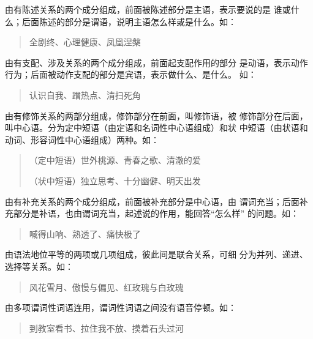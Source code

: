 \documentclass[final,oneside]{ctexbook}
\newenvironment{equotation}{\begin{quotation}\kaishu}{\end{quotation}}
\begin{document}
\begin{description}
  \item[主谓短语]由有陈述关系的两个成分组成，前面被陈述部分是主语，表示要说的是
    谁或什么；后面陈述的部分是谓语，说明主语怎么样或是什么。如：
    \begin{equotation}
      全剧终、心理健康、凤凰涅槃
    \end{equotation}

  \item[动宾短语]由有支配、涉及关系的两个成分组成，前面起支配作用的部分
    是动语，表示动作行为；后面被动作支配的部分是宾语，表示做什么、是什么。
    如：
    \begin{equotation}
      认识自我、蹭热点、清扫死角
    \end{equotation}

  \item[偏正短语]由有修饰关系的两部分组成，修饰部分在前面，叫修饰语，被
    修饰部分在后面，叫中心语。分为定中短语（由定语和名词性中心语组成）和状
    中短语（由状语和动词、形容词性中心语组成）两种。如：
    \begin{equotation}
      （定中短语）世外桃源、青春之歌、清澈的爱

      （状中短语）独立思考、十分幽僻、明天出发
    \end{equotation}

  \item[中补短语]由有补充关系的两个成分组成，前面被补充部分是中心语，由
    谓词充当；后面补充部分是补语，也由谓词充当，起述说的作用，能回答“怎么样”
    的问题。如：
    \begin{equotation}
      喊得山响、熟透了、痛快极了
    \end{equotation}

  \item[联合短语]由语法地位平等的两项或几项组成，彼此间是联合关系，可细
    分为并列、递进、选择等关系。如：
    \begin{equotation}
      风花雪月、傲慢与偏见、红玫瑰与白玫瑰
    \end{equotation}

  \item[连谓短语]由多项谓词性词语连用，谓词性词语之间没有语音停顿。如：
    \begin{equotation}
      到教室看书、拉住我不放、摸着石头过河
    \end{equotation}


\end{description}
\end{document}

